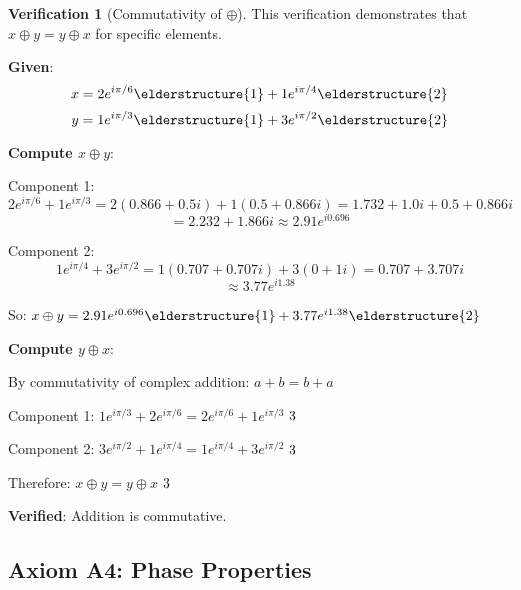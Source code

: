 \documentclass[12pt,a4paper]{article}
\newcommand{\checkmark}{\ding{51}}
\theoremstyle{definition}
\newtheorem{verification}{Verification}[section]
\theoremstyle{remark}
\begin{document}
\begin{verification}[Commutativity of $\oplus$]
This verification demonstrates that $x \oplus y = y \oplus x$ for specific elements.

\textbf{Given}:
$$x = 2e^{i\pi/6} \elderstructure{1} + 1e^{i\pi/4} \elderstructure{2}$$
$$y = 1e^{i\pi/3} \elderstructure{1} + 3e^{i\pi/2} \elderstructure{2}$$

\textbf{Compute $x \oplus y$}:

Component 1:
$$2e^{i\pi/6} + 1e^{i\pi/3} = 2(0.866 + 0.5i) + 1(0.5 + 0.866i) = 1.732 + 1.0i + 0.5 + 0.866i$$
$$= 2.232 + 1.866i \approx 2.91e^{i0.696}$$

Component 2:
$$1e^{i\pi/4} + 3e^{i\pi/2} = 1(0.707 + 0.707i) + 3(0 + 1i) = 0.707 + 3.707i$$
$$\approx 3.77e^{i1.38}$$

So: $x \oplus y = 2.91e^{i0.696} \elderstructure{1} + 3.77e^{i1.38} \elderstructure{2}$

\textbf{Compute $y \oplus x$}:

By commutativity of complex addition: $a + b = b + a$

Component 1: $1e^{i\pi/3} + 2e^{i\pi/6} = 2e^{i\pi/6} + 1e^{i\pi/3}$ $\checkmark$

Component 2: $3e^{i\pi/2} + 1e^{i\pi/4} = 1e^{i\pi/4} + 3e^{i\pi/2}$ $\checkmark$

Therefore: $x \oplus y = y \oplus x$ $\checkmark$

\textbf{Verified}: Addition is commutative.
\end{verification}

\subsection{Axiom A4: Phase Properties}
\end{document}
